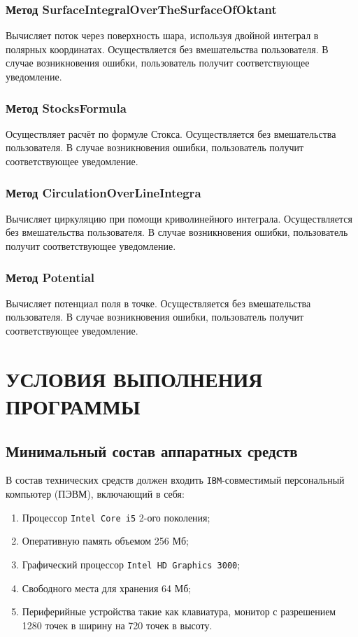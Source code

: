 \documentclass[14pt,a4paper,final]{extreport}
\begin{document}
\subsection{Метод SurfaceIntegralOverTheSurfaceOfOktant}
Вычисляет поток через поверхность шара, используя двойной интеграл в полярных координатах. Осуществляется без вмешательства пользователя. 
В случае возникновения ошибки, пользователь получит соответствующее уведомление.

\subsection{Метод StocksFormula}
Осуществляет расчёт по формуле Стокса. Осуществляется без вмешательства пользователя. 
В случае возникновения ошибки, пользователь получит соответствующее уведомление.

\subsection{Метод CirculationOverLineIntegra}
Вычисляет циркуляцию при помощи криволинейного интеграла. Осуществляется без вмешательства пользователя. 
В случае возникновения ошибки, пользователь получит соответствующее уведомление.

\subsection{Метод Potential}
Вычисляет потенциал поля в точке. Осуществляется без вмешательства пользователя. 
В случае возникновения ошибки, пользователь получит соответствующее уведомление.

\chapter{УСЛОВИЯ ВЫПОЛНЕНИЯ ПРОГРАММЫ}

\section{Минимальный состав аппаратных средств}

В состав технических средств должен входить \texttt{IBM}-совместимый персональный компьютер
(ПЭВМ), включающий в себя:
\begin{enumerate}[label=\asbuk*),ref=\asbuk*]
	\item Процессор \texttt{Intel Core i5} 2-ого поколения;
	\item Оперативную память объемом 256 Мб;
	\item Графический процессор \texttt{Intel HD Graphics 3000};
	\item Свободного места для хранения 64 Мб;
	\item Периферийные устройства такие как клавиатура, монитор с разрешением 1280 точек в ширину на 720 точек в высоту.
\end{enumerate}
\end{document}
